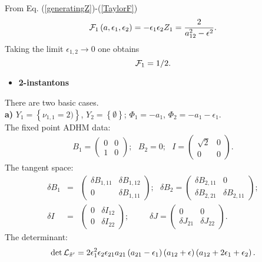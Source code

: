 \documentclass[a4paper,12pt]{article}
\begin{document}
From Eq. (\ref{generatingZ})-(\ref{TaylorF})
\begin{equation}
{\cal F}_1\left(a, \epsilon_1, \epsilon_2 \right)=-\epsilon_1
\epsilon_2 Z_1 =\frac{2}{a_{12}^2-\epsilon^2}.
\end{equation}
Taking the limit $\epsilon_{1,2}\rightarrow 0$ one obtains
\[
{\cal F}_1=1/2.
\]
\begin{itemize}
\item {\bf 2-instantons} \end{itemize} There are two basic cases.
\\
{\bf a)} $Y_1=\left\{\nu_{1,1}=2)\right\}$,
$Y_2=\left\{\emptyset\right\}$;
$\Phi_1=-a_1$, $\Phi_2=-a_1-\epsilon_1$. \\
The fixed point ADHM data:
\begin{eqnarray}
B_1=\left(\begin{array}{cc}
0 & 0 \\ 1 & 0
\end{array}\right); \, \, \, \,
B_2=0; \, \, \, \, I=\left(\begin{array}{cc} \sqrt{2} & 0 \\ 0 & 0
\end{array}\right).
\end{eqnarray}
The tangent space:
\begin{eqnarray}
\delta B_1 &=& \left(\begin{array}{cc} \delta B_{1,11} & \delta B_{1,12} \\ 0 & \delta B_{1,11}
\end{array}\right); \, \, \, \,
\delta B_2 =\left(\begin{array}{cc} \delta B_{2,11} & 0 \\ \delta B_{2,21} & \delta B_{2,11}
\end{array}\right); \nonumber \\
\delta I &=&\left(\begin{array}{cc} 0 & \delta I_{12} \\ 0 & \delta I_{22}
\end{array}\right); \, \, \, \, \, \, \, \, \, \, \, \, \, \, \,
\delta J=\left(\begin{array}{cc} 0 & 0 \\ \delta J_{21} & \delta J_{22}
\end{array}\right).
\end{eqnarray}
The determinant:
\begin{equation}
\det {\cal L}_{{\tilde x}'}=2 \epsilon_1^2 \epsilon_2
\epsilon_{21} a_{21} \left(a_{21}-\epsilon_1 \right)
\left(a_{12}+\epsilon \right) \left(a_{12}+2 \epsilon_1
+\epsilon_2 \right).
\end{equation}
\end{document}
